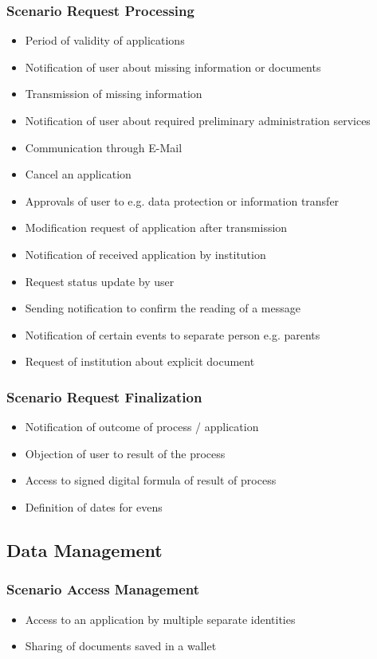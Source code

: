 \documentclass[
     12pt,         %
     a4paper,      %
     BCOR=10mm,version=first,     %
     DIV=14,version=first,        %
     ]{scrreprt}
\begin{document}
\subsubsection{Scenario Request Processing}
\begin{itemize}
    \item Period of validity of applications
    \item Notification of user about missing information or documents
    \item Transmission of missing information
    \item Notification of user about required preliminary administration services
    \item Communication through E-Mail
    \item Cancel an application
    \item Approvals of user to e.g. data protection or information transfer
    \item Modification request of application after transmission
    \item Notification of received application by institution
    \item Request status update by user
    \item Sending notification to confirm the reading of a message
    \item Notification of certain events to separate person e.g. parents
    \item Request of institution about explicit document
\end{itemize}

\subsubsection{Scenario Request Finalization}
\begin{itemize}
    \item Notification of outcome of process / application
    \item Objection of user to result of the process
    \item Access to signed digital formula of result of process
    \item Definition of dates for evens
\end{itemize}

\subsection{Data Management}

\subsubsection{Scenario Access Management}
\begin{itemize}
    \item Access to an application by multiple separate identities
    \item Sharing of documents saved in a wallet
\end{itemize}
\end{document}
